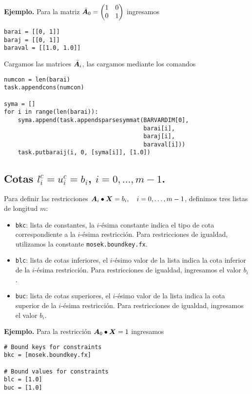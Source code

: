 \documentclass[11pt]{article}
\begin{document}
\textbf{Ejemplo.} Para la matriz $\bar {\bm{A}}_0 = \begin{pmatrix} 1 & 0 \\ 0 & 1 \end{pmatrix}$ ingresamos
\begin{lstlisting}
barai = [[0, 1]]
baraj = [[0, 1]]
baraval = [[1.0, 1.0]]
\end{lstlisting}

Cargamos las matrices $\bar {\bm{A}}_i$, las cargamos mediante los comandos
\begin{lstlisting}
numcon = len(barai)
task.appendcons(numcon)

syma = []
for i in range(len(barai)):
    syma.append(task.appendsparsesymmat(BARVARDIM[0],
                                        barai[i],
                                        baraj[i],
                                        baraval[i]))
    task.putbaraij(i, 0, [syma[i]], [1.0])
\end{lstlisting}

\subsection{Cotas  $l_i^c = u_i^c = b_i$, $i = 0, \dots, m-1$.}

Para definir las restricciones $\bm{A}_i \bullet \bm{X} = b_i, \quad i = 0, \dots, m-1$, definimos tres listas de longitud $m$:
\begin{itemize}
\item \texttt{bkc}: lista de constantes, la $i$-ésima constante indica el tipo de cota correspondiente a la $i$-ésima restricción. Para restricciones de igualdad, utilizamos la constante \texttt{mosek.boundkey.fx}.
\item \texttt{blc}: lista de cotas inferiores, el $i$-ésimo valor de la lista indica la cota inferior de la $i$-ésima restricción. Para restricciones de igualdad, ingresamos el valor $b_i$.
\item \texttt{buc}: lista de cotas superiores, el $i$-ésimo valor de la lista indica la cota superior de la $i$-ésima restricción. Para restricciones de igualdad, ingresamos el valor $b_i$.
\end{itemize}

\textbf{Ejemplo.} Para la restricción $\bm{A}_0 \bullet \bm{X} = 1$ ingresamos
\begin{lstlisting}
# Bound keys for constraints
bkc = [mosek.boundkey.fx]

# Bound values for constraints
blc = [1.0]
buc = [1.0]
\end{lstlisting}
\end{document}
